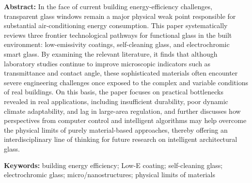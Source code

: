 \documentclass[UTF8,10pt,a4paper,fontset=none]{ctexart}
\begin{document}
{\small\justifying\noindent
\textbf{\color{rscblue}Abstract:} In the face of current building energy-efficiency challenges, transparent glass windows remain a major physical weak point responsible for substantial air-conditioning energy consumption. This paper systematically reviews three frontier technological pathways for functional glass in the built environment: low-emissivity coatings, self-cleaning glass, and electrochromic smart glass. By examining the relevant literature, it finds that although laboratory studies continue to improve microscopic indicators such as transmittance and contact angle, these sophisticated materials often encounter severe engineering challenges once exposed to the complex and variable conditions of real buildings. On this basis, the paper focuses on practical bottlenecks revealed in real applications, including insufficient durability, poor dynamic climate adaptability, and lag in large-area regulation, and further discusses how perspectives from computer control and intelligent algorithms may help overcome the physical limits of purely material-based approaches, thereby offering an interdisciplinary line of thinking for future research on intelligent architectural glass.
\par}

\vspace{0.8em}
{\small\justifying\noindent
\textbf{\color{rscblue}Keywords:} building energy efficiency; Low-E coating; self-cleaning glass; electrochromic glass; micro/nanostructures; physical limits of materials
\par}

\vspace{1.5em}
\end{document}
